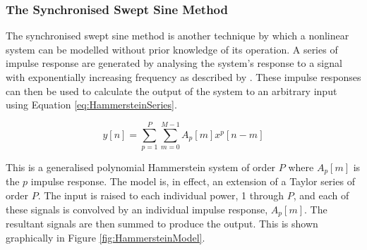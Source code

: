 		\subsubsection{The Synchronised Swept Sine Method}
			The synchronised swept sine method is another technique by which a nonlinear system can be modelled
			without prior knowledge of its operation. A series of impulse response are generated by analysing
			the system's response to a signal with exponentially increasing frequency as described by
			\citet{novak2010nonlinear}. These impulse responses can then be used to calculate the output of the
			system to an arbitrary input using Equation \ref{eq:HammersteinSeries}.

			\begin{equation}
				y[n] = \sum_{p = 1}^{P}
					\sum_{m = 0}^{M - 1} A_{p}[m]x^{p}[n-m]
				\label{eq:HammersteinSeries}
			\end{equation}

			This is a generalised polynomial Hammerstein system of order $P$ where $A_{p}[m]$ is the
			$p$ impulse response. The model is, in effect, an extension of a Taylor series of order
			$P$. The input is raised to each individual power, 1 through $P$, and each of these signals is
			convolved by an individual impulse response, $A_{p}[m]$. The resultant signals are then summed to
			produce the output. This is shown graphically in Figure \ref{fig:HammersteinModel}.

